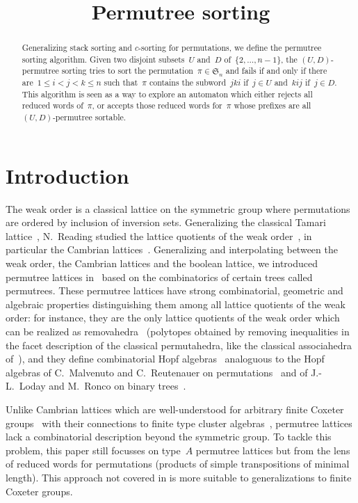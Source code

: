 \documentclass[ALCO]{cedram}
\title{Permutree sorting}
\author[\initial{V.} Pilaud]{\firstname{Vincent} \lastname{Pilaud}}
\author[\initial{V.} Pons]{\firstname{Vivane} \lastname{Pons}}
\author[\initial{D.} Tamayo Jimenez]{\firstname{Daniel} \lastname{Tamayo Jimenez}}
\begin{document}
\begin{abstract}
Generalizing stack sorting and $c$-sorting for permutations, we define the permutree sorting algorithm.
Given two disjoint subsets~$U$ and~$D$ of~$\{2, \dots, n-1\}$, the $(U,D)$-permutree sorting tries to sort the permutation~$\pi \in \mathfrak{S}_n$ and fails if and only if there are~$1 \le i < j < k \le n$ such that~$\pi$ contains the subword~$jki$ if~$j \in U$ and~$kij$ if~$j \in D$.
This algorithm is seen as a way to explore an automaton which either rejects all reduced words of~$\pi$, or accepts those reduced words for~$\pi$ whose prefixes are all $(U,D)$-permutree sortable.
\end{abstract}

\maketitle

\section{Introduction}

The weak order is a classical lattice on the symmetric group where permutations are ordered by inclusion of inversion sets.
Generalizing the classical Tamari lattice~\cite{Tamari}, N.~Reading studied the lattice quotients of the weak order~\cite{Reading-latticeCongruences}, in particular the Cambrian lattices~\cite{Reading-cambrianLattices,Reading-coxeterSortable}.
Generalizing and interpolating between the weak order, the Cambrian lattices and the boolean lattice, we introduced permutree lattices in~\cite{PilaudPons-permutrees} based on the combinatorics of certain trees called permutrees.
These permutree lattices have strong combinatorial, geometric and algebraic properties distinguishing them among all lattice quotients of the weak order: for instance, they are the only lattice quotients of the weak order which can be realized as removahedra~\cite{AlbertinPilaudRitter-Removahedra} (\ie polytopes obtained by removing inequalities in the facet description of the classical permutahedra, like the classical associahedra of~\cite{Loday,HohlwegLange}), and they define combinatorial Hopf algebras~\cite{PilaudPons-permutrees} analoguous to the Hopf algebras of C.~Malvenuto and C.~Reutenauer on permutations~\cite{MalvenutoReutenauer} and of J.-L.~Loday and M.~Ronco on binary trees~\cite{LodayRonco}.



Unlike Cambrian lattices which are well-understood for arbitrary finite Coxeter groups~\cite{Reading-cambrianLattices,Reading-coxeterSortable} with their connections to finite type cluster algebras~\cite{FominZelevinsky-ClusterAlgebrasI,FominZelevinsky-ClusterAlgebrasII}, permutree lattices lack a combinatorial description beyond the symmetric group.
To tackle this problem, this paper still focusses on type~$A$ permutree lattices but from the lens of reduced words for permutations (\ie products of simple transpositions of minimal length).
This approach not covered in \cite{PilaudPons-permutrees} is more suitable to generalizations to finite Coxeter groups.
\end{document}
